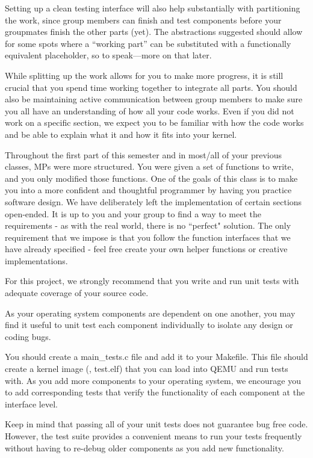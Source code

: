 \documentclass{article}
\begin{document}
Setting up a clean testing interface will also help substantially with
partitioning the work, since group members can finish and test components
before your groupmates finish the other parts (yet).
The abstractions suggested %
should allow for some spots where a ``working part'' can be substituted with
a functionally equivalent placeholder, so to speak---more on that later.

While splitting up the work allows for you to make more progress, it is still
crucial that you spend time working together to integrate all parts. You should
also be maintaining active communication between group members to make sure
you all have an understanding of how all your code works. Even if you did not
work on a specific section, we expect you to be familiar with how the code works
and be able to explain what it and how it fits into your kernel.

Throughout the first part of this semester and in most/all of your previous classes, 
MPs were more structured. You were given a set of functions to write, and you only modified
those functions. One of the goals of this class is to make you into a more confident and thoughtful
programmer by having you practice software design. We have deliberately left the implementation 
of certain sections open-ended. It is up to you and your group to find a way to meet the requirements - as with 
the real world, there
is no ``perfect" solution. The only requirement that we impose is that you follow the function interfaces
that we have already specified - feel free create your own helper functions or creative implementations.

\bigbreak{}
\pagebreak
{}

For this project, we strongly recommend that you write and run unit tests with adequate coverage of your source code.

As your operating system components are dependent on one another, you may find it useful to unit test each component individually to isolate any design or coding bugs.

You should create a {\fix main\_tests.c} file and add it to your {\fix Makefile}. This file should create a kernel image (\eg, {\fix test.elf}) that you can load
into QEMU and run tests with.
As you add more components to your operating system, we encourage you to add corresponding tests that verify the functionality of each component at the interface level.

Keep in mind that passing all of your unit tests does not guarantee bug free code. However, the test suite provides a convenient means to run your tests frequently without having to re-debug older components as you add new functionality.
\end{document}
